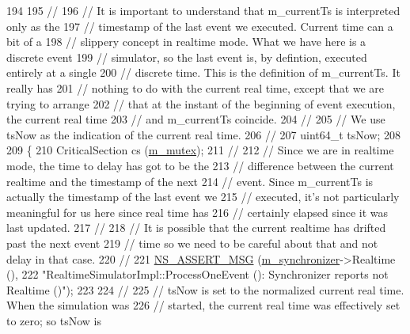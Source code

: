\begin{DoxyCode}
194 
195       \textcolor{comment}{//}
196       \textcolor{comment}{// It is important to understand that m\_currentTs is interpreted only as the }
197       \textcolor{comment}{// timestamp  of the last event we executed.  Current time can a bit of a }
198       \textcolor{comment}{// slippery concept in realtime mode.  What we have here is a discrete event }
199       \textcolor{comment}{// simulator, so the last event is, by defintion, executed entirely at a single}
200       \textcolor{comment}{//  discrete time.  This is the definition of m\_currentTs.  It really has }
201       \textcolor{comment}{// nothing to do with the current real time, except that we are trying to arrange}
202       \textcolor{comment}{// that at the instant of the beginning of event execution, the current real time}
203       \textcolor{comment}{// and m\_currentTs coincide.}
204       \textcolor{comment}{//}
205       \textcolor{comment}{// We use tsNow as the indication of the current real time.}
206       \textcolor{comment}{//}
207       uint64\_t tsNow;
208 
209       \{ 
210         CriticalSection cs (\hyperlink{classns3_1_1RealtimeSimulatorImpl_a02be368e7cbd8a6f9d62db36c3fd373b}{m\_mutex});
211         \textcolor{comment}{//}
212         \textcolor{comment}{// Since we are in realtime mode, the time to delay has got to be the }
213         \textcolor{comment}{// difference between the current realtime and the timestamp of the next }
214         \textcolor{comment}{// event.  Since m\_currentTs is actually the timestamp of the last event we }
215         \textcolor{comment}{// executed, it's not particularly meaningful for us here since real time has}
216         \textcolor{comment}{// certainly elapsed since it was last updated.}
217         \textcolor{comment}{//}
218         \textcolor{comment}{// It is possible that the current realtime has drifted past the next event}
219         \textcolor{comment}{// time so we need to be careful about that and not delay in that case.}
220         \textcolor{comment}{//}
221         \hyperlink{assert_8h_aff5ece9066c74e681e74999856f08539}{NS\_ASSERT\_MSG} (\hyperlink{classns3_1_1RealtimeSimulatorImpl_a87a72268b521afcae7ea4c891c398d27}{m\_synchronizer}->Realtime (), 
222                        \textcolor{stringliteral}{"RealtimeSimulatorImpl::ProcessOneEvent (): Synchronizer reports not Realtime ()"});
223 
224         \textcolor{comment}{//}
225         \textcolor{comment}{// tsNow is set to the normalized current real time.  When the simulation was}
226         \textcolor{comment}{// started, the current real time was effectively set to zero; so tsNow is}

\end{DoxyCode}
